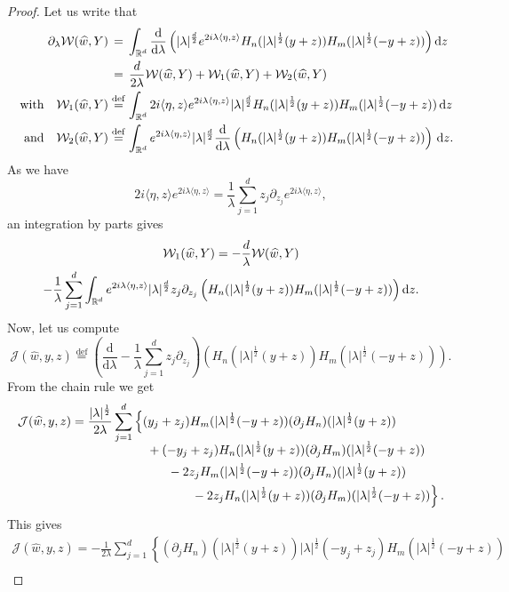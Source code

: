 \documentclass[AHL,Unicode,longabstracts]{cedram}
\let\wh=\widehat
\def\R{{\mathop{\mathbb R\kern 0pt}\nolimits}}
\newcommand{\lam}{\lambda}
\newcommand{\wh}{\widehat}
\newcommand*\cJ{\mathcal{J}}
\newcommand*\cW{\mathcal{W}}
\newcommand*\R{\mathbb{R}}
\newcommand{\andf}{\quad\hbox{and}\quad}
\newcommand{\with}{\quad\hbox{with}\quad}
\newcommand*\eqdefa{\overset{\mathrm{def}}{=}}
\newcommand*\peqdefa{\overset{\phantom{\mathrm{def}}}{=}}
\newcommand*{\dd}{\mathrm{d}}
\newcommand{\dz}{\dd z}
\newcommand{\dlambda}{\dd \lambda}
\renewcommand*{\cdotp}{.}
\begin{document}
\begin{proof}
Let us write that
\[
\begin{aligned}
\partial_\lam \cW(\wh w,Y) &\peqdefa \int_{\R^d} \frac{\dd}{\dlambda} \left(|\lam|^{\frac d 2} e^{2i\lam\langle \eta,z\rangle} H_n (|\lam|^{\frac 12} (y+z)) H_m(|\lam|^{\frac 12} (-y+z)) \right) \dz\\
&\peqdefa \frac d {2\lam} \cW(\wh w,Y) +\cW_1(\wh w,Y) + \cW_2(\wh w,Y) \\ \with
\cW_1(\wh w,Y) &\eqdefa
\int_{\R^d} 2i\langle \eta,z\rangle e^{2i\lam\langle \eta,z\rangle} |\lam|^{\frac d 2} H_n (|\lam|^{\frac 12} (y+z)) H_m(|\lam|^{\frac 12} (-y+z))\, \dz\\
\andf \cW_2(\wh w,Y) &\eqdefa
\int_{\R^d} e^{2i\lam\langle \eta,z\rangle} |\lam|^{\frac d 2} \frac{\dd}{\dlambda} \left(H_n (|\lam|^{\frac 12} (y+z)) H_m(|\lam|^{\frac 12} (-y+z))\right)\, \dz.
\end{aligned}
\]
As we have
\[
2i\langle \eta,z\rangle e^{2i\lam\langle \eta,z\rangle } = \frac 1 \lam \sum_{j=1}^d z_j\partial_{z_j} e^{2i\lam\langle \eta,z\rangle },
\]
an integration by parts gives
\begin{multline*}
\cW_1(\wh w,Y) = -\frac d {\lam} \cW(\wh w,Y)\\  -\frac1\lambda \sum_{j=1} ^d \int_{\R^d} e^{2i\lam\langle \eta,z\rangle} |\lam|^{\frac d 2} z_j\partial_{z_j} \left(H_n (|\lam|^{\frac 12} (y+z)) H_m(|\lam|^{\frac 12} (-y+z))\right) \dz.
\end{multline*}
Now, let us compute
\[
\cJ(\wh w,y,z) \eqdefa \left (\frac{\dd}{\dlambda} -\frac1\lambda\sum_{j=1}^d z_j\partial_{z_j}\right) \left(H_n (|\lam|^{\frac 12} (y+z)) H_m(|\lam|^{\frac 12} (-y+z))\right).
\]
From the chain rule we get
\begin{align*}
\cJ(\wh w,y,z) &= \frac {|\lam|^{\frac 12} }{2\lam} \sum_{j=1}^d \left\{ (y_j+z_j) H_m(|\lam|^{\frac 12} (-y+z)) (\partial_j H_n) (|\lam|^{\frac 12} (y+z))\right. \\[-0.5em]
&\mkern 110mu+(-y_j+z_j) H_n (|\lam|^{\frac 12} (y+z)) (\partial_j H_m)(|\lam|^{\frac 12} (-y+z))\\
&\mkern 140mu- 2 z_j H_m(|\lam|^{\frac 12} (-y+z)) (\partial_jH_n) (|\lam|^{\frac 12} (y+z))\\
&\mkern 170mu\left.{} -2 z_j H_n (|\lam|^{\frac 12} (y+z)) (\partial_j H_m)(|\lam|^{\frac 12} (-y+z))
\right\}\cdotp
\end{align*}
This gives
\begin{multline*}
\cJ(\wh w,y,z) = - \frac {1 }{2\lam} \sum_{j=1}^d \left\{ (\partial_j H_n) (|\lam|^{\frac 12} (y+z)) |\lam|^{\frac 12}(-y_j+z_j) H_m(|\lam|^{\frac 12} (-y+z))\right.\\[-0.3em]

\end{multline*}
\end{proof}
\end{document}
